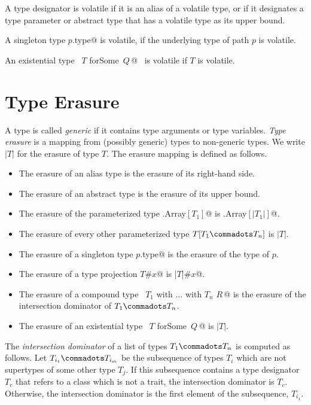 A type designator is volatile if it is an alias of a volatile type, or
if it designates a type parameter or abstract type that has a volatile type as its
upper bound.

A singleton type \lstinline@$p$.type@ is volatile, if the underlying
type of path $p$ is volatile.

An existential type ~\lstinline@$T$ forSome {$\,Q\,$}@~ is volatile if
$T$ is volatile.

\section{Type Erasure}
\label{sec:erasure}

A type is called {\em generic} if it contains type arguments or type variables.
{\em Type erasure} is a mapping from (possibly generic) types to
non-generic types. We write $|T|$ for the erasure of type $T$.
The erasure mapping is defined as follows.
\begin{itemize}
\item The erasure of an alias type is the erasure of its right-hand side. %
\item The erasure of an abstract type is the erasure of its upper bound.
\item The erasure of the parameterized type \lstinline@scala.Array$[T_1]$@ is
 \lstinline@scala.Array$[|T_1|]$@.
 \item The erasure of every other parameterized type $T[T_1 \commadots T_n]$ is $|T|$.
\item The erasure of a singleton type \lstinline@$p$.type@ is the 
      erasure of the type of $p$.
\item The erasure of a type projection \lstinline@$T$#$x$@ is \lstinline@|$T$|#$x$@.
\item The erasure of a compound type 
~\lstinline@$T_1$ with $\ldots$ with $T_n$ {$R\,$}@ is the erasure of the intersection dominator of
  $T_1 \commadots T_n$.
\item The erasure of an existential type ~\lstinline@$T$ forSome {$\,Q\,$}@ 
      is $|T|$.
\end{itemize}

The {\em intersection dominator} of a list of types $T_1 \commadots
T_n$ is computed as follows.
Let $T_{i_1} \commadots T_{i_m}$ be the subsequence of types $T_i$  
which are not supertypes of some other type $T_j$. 
If this subsequence contains a type designator $T_c$ that refers to a class which is not a trait, 
the intersection dominator is $T_c$. Otherwise, the intersection
dominator is the first element of the subsequence, $T_{i_1}$.


